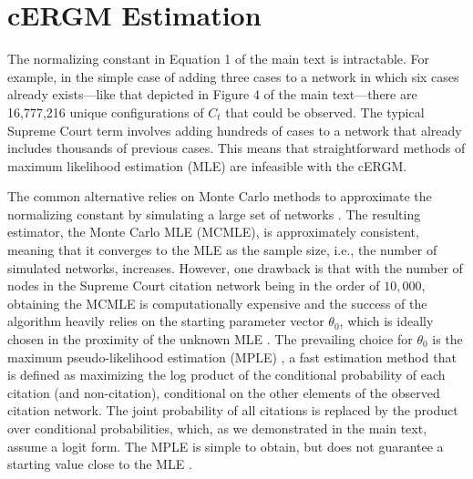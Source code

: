 \documentclass[headsepline=true, abstracton]{scrartcl}
\begin{document}
\singlespacing
 


\onehalfspacing
\appendix
\section{cERGM Estimation}

The normalizing constant in Equation 1 of the main text is intractable. For example, in the simple case of adding three cases to a network in which six cases already exists---like that depicted in Figure 4 of the main text---there are 16,777,216 unique configurations of $C_t$ that could be observed. The typical Supreme Court term involves adding hundreds of cases to a network that already includes thousands of previous cases. This means that straightforward methods of maximum likelihood estimation (MLE) are infeasible with the cERGM. 

The common alternative relies on Monte Carlo methods to approximate the normalizing constant by simulating a large set of networks \citep{hunter2006inference,hummel2012improving}. The resulting estimator, the Monte Carlo MLE (MCMLE), is approximately consistent, meaning that it converges to the MLE as the sample size, i.e., the number of simulated networks, increases. However, one drawback is that with the number of nodes in the Supreme Court citation network being in the order of $10,000$, obtaining the MCMLE is computationally expensive \citep{schmid2017exponential} and the success of the algorithm heavily relies on the starting parameter vector $\theta_0$, which is ideally chosen in the proximity of the unknown MLE \citep{hummel2012improving}. The prevailing choice for $\theta_0$ is the maximum pseudo-likelihood estimation (MPLE) \citep{strauss1990pseudolikelihood}, a fast estimation method that is defined as maximizing the log product of the conditional probability of each citation (and non-citation), conditional on the other elements of the observed citation network. The joint probability of all citations is replaced by the product over conditional probabilities, which, as we demonstrated in the main text, assume a logit form. The MPLE is simple to obtain, but does not guarantee a starting value close to the MLE \citep{SchmidHunter2020}. 
\end{document}
